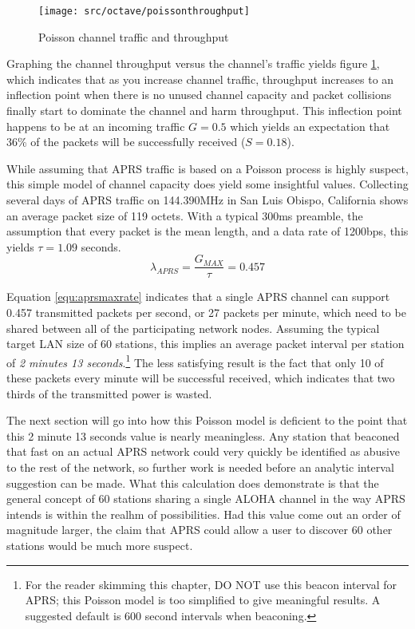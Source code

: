 \begin{figure}
	\centering
	\texttt{[image: src/octave/poissonthroughput]}
	\caption{Poisson channel traffic and throughput}
	\label{fig:SGpoisson}
\end{figure}
Graphing the channel throughput versus the channel's traffic yields figure 
\ref{fig:SGpoisson}, which indicates that as you increase channel traffic, 
throughput increases to an inflection point when there is no unused channel capacity
and packet collisions finally start to dominate
the channel and harm throughput. This inflection point happens to be at
an incoming traffic $G = 0.5$ which yields an expectation that 36\% of the packets
will be successfully received ($S = 0.18$).

While assuming that APRS traffic is based on a Poisson process is 
highly suspect, this simple model of channel capacity does yield some insightful 
values. 
Collecting several days of APRS traffic on 144.390MHz in San Luis Obispo, California
shows an average packet size of 119 octets. With a typical 300ms preamble,
the assumption that every packet is the mean length,
and a data rate of 1200bps, this yields $\tau = 1.09$ seconds.
\begin{equation}
	\lambda_{APRS} = \frac{G_{MAX}}{\tau} = 0.457
	\label{equ:aprsmaxrate}
\end{equation}

Equation \ref{equ:aprsmaxrate} indicates that a single APRS channel can support
0.457 transmitted packets per second, or
27 packets per minute, which need to be shared between
all of the participating network nodes.
Assuming the typical target LAN size of 60 stations, 
this implies an average packet interval per station
of \emph{2 minutes 13 seconds}.\footnote{For the reader skimming this chapter, DO NOT
	use this beacon interval for APRS; this Poisson model is too simplified to give
meaningful results. A suggested default is 600 second intervals when beaconing.}
The less satisfying result is the fact that only 10 of these packets every minute will be
successful received, which indicates that
two thirds of the transmitted power is wasted.

The next section will go into how this Poisson model is deficient to the
point that this 2 minute 13 seconds value is nearly meaningless.
Any station that beaconed that fast on an actual APRS network could very quickly
be identified as abusive to the rest of the network, so further work is needed
before an analytic interval suggestion can be made.
What this calculation does demonstrate is that the general concept of 60 stations
sharing a single ALOHA channel in the way APRS intends is within the realhm of
possibilities. 
Had this value come out an order of magnitude larger, the claim
that APRS could allow a user to discover 60 other stations would be much more suspect.

